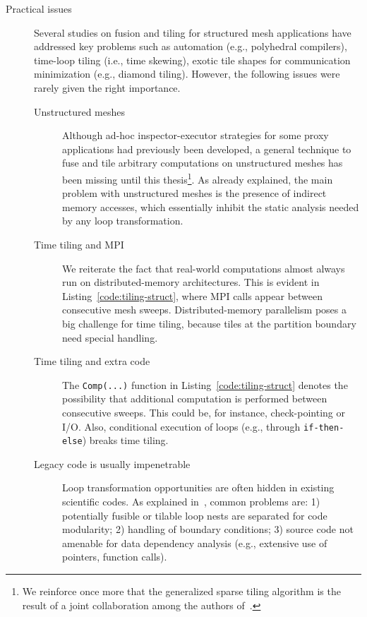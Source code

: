 \begin{description}
\item[Practical issues] Several studies on fusion and tiling for structured mesh applications have addressed key problems such as automation (e.g., polyhedral compilers), time-loop tiling (i.e., time skewing), exotic tile shapes for communication minimization (e.g., diamond tiling). However, the following issues were rarely given the right importance.
\begin{description}
\item[Unstructured meshes] Although ad-hoc inspector-executor strategies for some proxy applications had previously been developed, a general technique to fuse and tile arbitrary computations on unstructured meshes has been missing until this thesis\footnote{We reinforce once more that the generalized sparse tiling algorithm is the result of a joint collaboration among the authors of~\cite{st-paper}.}. As already explained, the main problem with unstructured meshes is the presence of indirect memory accesses, which essentially inhibit the static analysis needed by any loop transformation.
\item[Time tiling and MPI] We reiterate the fact that real-world computations almost always run on distributed-memory architectures. This is evident in Listing~\ref{code:tiling-struct}, where MPI calls appear between consecutive mesh sweeps. Distributed-memory parallelism poses a big challenge for time tiling, because tiles at the partition boundary need special handling.
\item[Time tiling and extra code] The \texttt{Comp(...)} function in Listing~\ref{code:tiling-struct} denotes the possibility that additional computation is performed between consecutive sweeps. This could be, for instance, check-pointing or I/O. Also, conditional execution of loops (e.g., through \texttt{if-then-else}) breaks time tiling. 
\item[Legacy code is usually impenetrable] Loop transformation opportunities are often hidden in existing scientific codes. As explained in~\cite{strout-common-problems}, common problems are: 1) potentially fusible or tilable loop nests are separated for code modularity; 2) handling of boundary conditions; 3) source code not amenable for data dependency analysis (e.g., extensive use of pointers, function calls).
\end{description}


\end{description}
